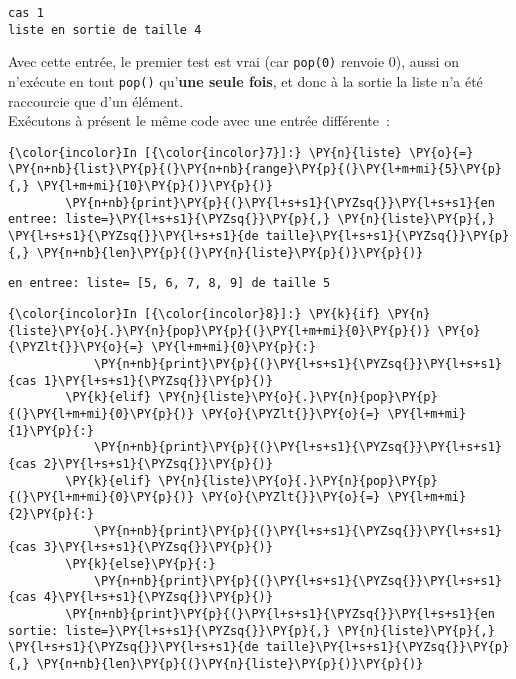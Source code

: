     \begin{Verbatim}[commandchars=\\\{\}]
cas 1
liste en sortie de taille 4

    \end{Verbatim}

    Avec cette entrée, le premier test est vrai (car \texttt{pop(0)} renvoie
0), aussi on n'exécute en tout \texttt{pop()} qu'\textbf{une seule
fois}, et donc à la sortie la liste n'a été raccourcie que d'un élément.\\

    Exécutons à présent le même code avec une entrée différente~:

    \begin{Verbatim}[commandchars=\\\{\}]
{\color{incolor}In [{\color{incolor}7}]:} \PY{n}{liste} \PY{o}{=} \PY{n+nb}{list}\PY{p}{(}\PY{n+nb}{range}\PY{p}{(}\PY{l+m+mi}{5}\PY{p}{,} \PY{l+m+mi}{10}\PY{p}{)}\PY{p}{)}
        \PY{n+nb}{print}\PY{p}{(}\PY{l+s+s1}{\PYZsq{}}\PY{l+s+s1}{en entree: liste=}\PY{l+s+s1}{\PYZsq{}}\PY{p}{,} \PY{n}{liste}\PY{p}{,} \PY{l+s+s1}{\PYZsq{}}\PY{l+s+s1}{de taille}\PY{l+s+s1}{\PYZsq{}}\PY{p}{,} \PY{n+nb}{len}\PY{p}{(}\PY{n}{liste}\PY{p}{)}\PY{p}{)}
\end{Verbatim}


    \begin{Verbatim}[commandchars=\\\{\}]
en entree: liste= [5, 6, 7, 8, 9] de taille 5

    \end{Verbatim}

    \begin{Verbatim}[commandchars=\\\{\}]
{\color{incolor}In [{\color{incolor}8}]:} \PY{k}{if} \PY{n}{liste}\PY{o}{.}\PY{n}{pop}\PY{p}{(}\PY{l+m+mi}{0}\PY{p}{)} \PY{o}{\PYZlt{}}\PY{o}{=} \PY{l+m+mi}{0}\PY{p}{:}
            \PY{n+nb}{print}\PY{p}{(}\PY{l+s+s1}{\PYZsq{}}\PY{l+s+s1}{cas 1}\PY{l+s+s1}{\PYZsq{}}\PY{p}{)}
        \PY{k}{elif} \PY{n}{liste}\PY{o}{.}\PY{n}{pop}\PY{p}{(}\PY{l+m+mi}{0}\PY{p}{)} \PY{o}{\PYZlt{}}\PY{o}{=} \PY{l+m+mi}{1}\PY{p}{:}
            \PY{n+nb}{print}\PY{p}{(}\PY{l+s+s1}{\PYZsq{}}\PY{l+s+s1}{cas 2}\PY{l+s+s1}{\PYZsq{}}\PY{p}{)}
        \PY{k}{elif} \PY{n}{liste}\PY{o}{.}\PY{n}{pop}\PY{p}{(}\PY{l+m+mi}{0}\PY{p}{)} \PY{o}{\PYZlt{}}\PY{o}{=} \PY{l+m+mi}{2}\PY{p}{:}
            \PY{n+nb}{print}\PY{p}{(}\PY{l+s+s1}{\PYZsq{}}\PY{l+s+s1}{cas 3}\PY{l+s+s1}{\PYZsq{}}\PY{p}{)}
        \PY{k}{else}\PY{p}{:}
            \PY{n+nb}{print}\PY{p}{(}\PY{l+s+s1}{\PYZsq{}}\PY{l+s+s1}{cas 4}\PY{l+s+s1}{\PYZsq{}}\PY{p}{)}
        \PY{n+nb}{print}\PY{p}{(}\PY{l+s+s1}{\PYZsq{}}\PY{l+s+s1}{en sortie: liste=}\PY{l+s+s1}{\PYZsq{}}\PY{p}{,} \PY{n}{liste}\PY{p}{,} \PY{l+s+s1}{\PYZsq{}}\PY{l+s+s1}{de taille}\PY{l+s+s1}{\PYZsq{}}\PY{p}{,} \PY{n+nb}{len}\PY{p}{(}\PY{n}{liste}\PY{p}{)}\PY{p}{)}
\end{Verbatim}


